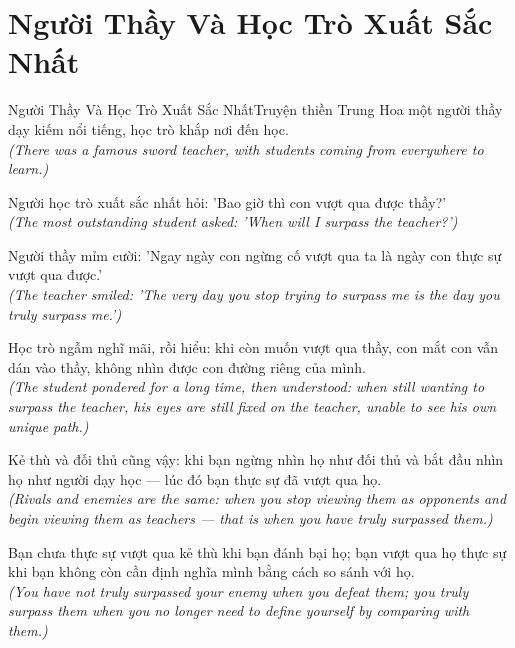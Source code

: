 \section{Người Thầy Và Học Trò Xuất Sắc Nhất}
\begin{truyen}{Người Thầy Và Học Trò Xuất Sắc Nhất}{Truyện thiền Trung Hoa}
 một người thầy dạy kiếm nổi tiếng, học trò khắp nơi đến học.\\[4pt]
\textit{(There was a famous sword teacher, with students coming from everywhere to learn.)}

Người học trò xuất sắc nhất hỏi: 'Bao giờ thì con vượt qua được thầy?'\\[4pt]
\textit{(The most outstanding student asked: 'When will I surpass the teacher?')}

Người thầy mỉm cười: 'Ngay ngày con ngừng cố vượt qua ta là ngày con thực sự vượt qua được.'\\[4pt]
\textit{(The teacher smiled: 'The very day you stop trying to surpass me is the day you truly surpass me.')}

Học trò ngẫm nghĩ mãi, rồi hiểu: khi còn muốn vượt qua thầy, con mắt con vẫn dán vào thầy, không nhìn được con đường riêng của mình.\\[4pt]
\textit{(The student pondered for a long time, then understood: when still wanting to surpass the teacher, his eyes are still fixed on the teacher, unable to see his own unique path.)}

Kẻ thù và đối thủ cũng vậy: khi bạn ngừng nhìn họ như đối thủ và bắt đầu nhìn họ như người dạy học --- lúc đó bạn thực sự đã vượt qua họ.\\[4pt]
\textit{(Rivals and enemies are the same: when you stop viewing them as opponents and begin viewing them as teachers --- that is when you have truly surpassed them.)}

\end{truyen}
\begin{baihoc}
  Bạn chưa thực sự vượt qua kẻ thù khi bạn đánh bại họ; bạn vượt qua họ thực sự khi bạn không còn cần định nghĩa mình bằng cách so sánh với họ.\\[4pt]
  \textit{(You have not truly surpassed your enemy when you defeat them; you truly surpass them when you no longer need to define yourself by comparing with them.)}
\end{baihoc}

